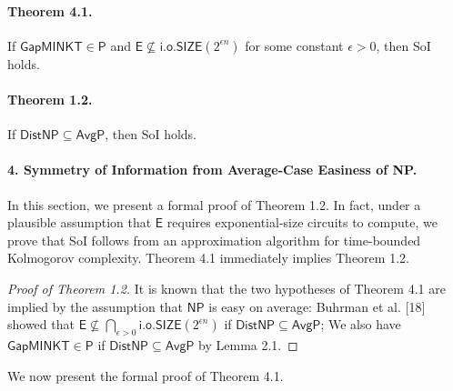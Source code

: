 \documentclass[10pt,a4paper]{article}
\begin{document}
\paragraph{Theorem 4.1.}
If $\mathsf{GapMINKT}\in\mathsf P$ and $\mathsf E\not\subseteq\mathsf{i.o.SIZE}(2^{\epsilon n})$ for some constant $\epsilon>0$, then SoI holds.
\paragraph{Theorem 1.2.}
If $\mathsf{DistNP}\subseteq\mathsf{AvgP}$, then SoI holds.

\paragraph{4. Symmetry of Information from Average-Case Easiness of NP.}
In this section, we present a formal proof of Theorem 1.2. In fact, under a plausible assumption that $\mathsf E$ requires exponential-size circuits to compute, we prove that SoI follows from an approximation algorithm for time-bounded Kolmogorov complexity.
Theorem 4.1 immediately implies Theorem 1.2.
\begin{proof}[Proof of Theorem 1.2]
It is known that the two hypotheses of Theorem 4.1 are implied by the assumption that $\mathsf{NP}$ is easy on average: Buhrman et al. [18] showed that $\mathsf E\not\subseteq\bigcap_{\epsilon>0}\mathsf{i.o.SIZE}(2^{\epsilon n})$ if $\mathsf{DistNP}\subseteq\mathsf{AvgP}$; We also have $\mathsf{GapMINKT}\in\mathsf P$ if $\mathsf{DistNP}\subseteq\mathsf{AvgP}$ by Lemma 2.1.
\end{proof}
We now present the formal proof of Theorem 4.1.
\end{document}

